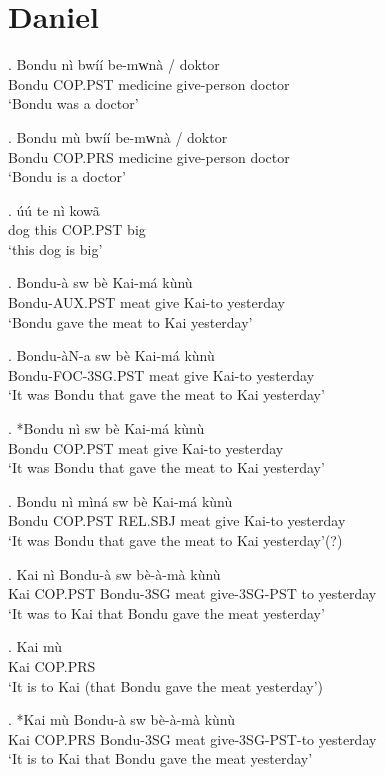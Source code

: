 \documentclass{assets/fieldnotes}
\begin{document}
\section{Daniel}
\exg. Bondu nì bwíí be-mᴡnà / doktor\\
Bondu COP.PST medicine give-person {} doctor\\
`Bondu was a doctor'

\exg. Bondu mù bwíí be-mᴡnà / doktor\\
Bondu COP.PRS medicine give-person {} doctor\\
`Bondu is a doctor'

\exg. úú te nì kowã\\
dog this COP.PST big\\
`this dog is big'

\exg. Bondu-à sw bè Kai-má kùnù\\
Bondu-AUX.PST meat give Kai-to yesterday\\
`Bondu gave the meat to Kai yesterday'

\exg. Bondu-àN-a sw bè Kai-má kùnù\\
Bondu-FOC-3SG.PST meat give Kai-to yesterday\\
`It was Bondu that gave the meat to Kai yesterday'

\exg. *Bondu nì sw bè Kai-má kùnù\\
Bondu COP.PST meat give Kai-to yesterday\\
`It was Bondu that gave the meat to Kai yesterday'

\exg. Bondu nì mìná sw bè Kai-má kùnù\\
Bondu COP.PST REL.SBJ meat give Kai-to yesterday\\
`It was Bondu that gave the meat to Kai yesterday'(?)

\exg. Kai nì Bondu-à sw bè-à-mà kùnù\\
Kai COP.PST Bondu-3SG meat give-3SG-PST to yesterday\\
`It was to Kai that Bondu gave the meat yesterday'

\exg. Kai mù\\
Kai COP.PRS\\
`It is to Kai (that Bondu gave the meat yesterday')

\exg. *Kai mù Bondu-à sw bè-à-mà kùnù\\
Kai COP.PRS Bondu-3SG meat give-3SG-PST-to yesterday\\
`It is to Kai that Bondu gave the meat yesterday'
\end{document}
